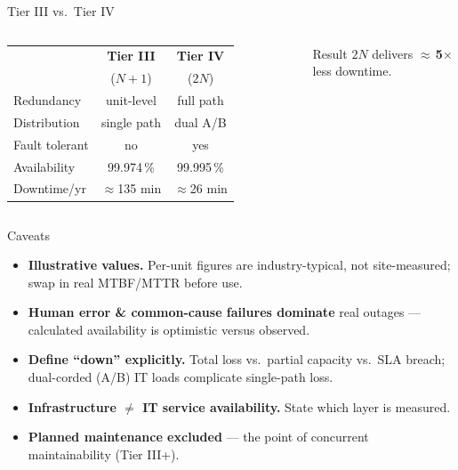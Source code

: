 \begin{frame}{Tier III vs.\ Tier IV}
  \begin{columns}[c]
      \renewcommand{\arraystretch}{1.3}
      \footnotesize
      \begin{tabular}{lcc}
        \toprule
         & \textbf{Tier III} & \textbf{Tier IV} \\
         & ($N{+}1$) & ($2N$) \\
        \midrule
        Redundancy   & unit-level & full path \\
        Distribution & single path & dual A/B \\
        Fault tolerant & no & yes \\
        Availability & 99.974\,\% & 99.995\,\% \\
        Downtime/yr  & $\approx$135 min & $\approx$26 min \\
        \bottomrule
      \end{tabular}

      \vspace{0.8em}
      \begin{block}{Result}
        \centering $2N$ delivers $\approx\,$\textbf{5$\times$} less downtime.
      \end{block}
      \centering
  \end{columns}
\end{frame}

\begin{frame}{Caveats}
  \begin{itemize}
    \item \textbf{Illustrative values.} Per-unit figures are industry-typical, not site-measured;
          swap in real MTBF/MTTR before use.
    \item \textbf{Human error \& common-cause failures dominate} real outages --- calculated
          availability is optimistic versus observed.
    \item \textbf{Define ``down'' explicitly.} Total loss vs.\ partial capacity vs.\ SLA breach;
          dual-corded (A/B) IT loads complicate single-path loss.
    \item \textbf{Infrastructure $\neq$ IT service availability.} State which layer is measured.
    \item \textbf{Planned maintenance excluded} --- the point of concurrent maintainability (Tier III+).
  \end{itemize}
\end{frame}

